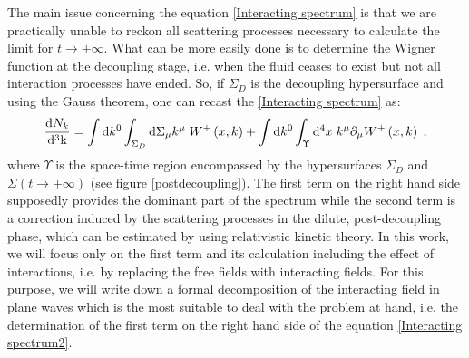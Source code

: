 \documentclass[prd,superscriptaddress,nofootinbib,notitlepage]{revtex4-1}
\newcommand{\kk}{{\rm k}}
\newcommand{\di}{{\rm d}}
\begin{document}
The main issue concerning the equation \eqref{Interacting spectrum} is that we are practically unable to reckon all 
scattering processes necessary to calculate the limit for $t \to +\infty$. What can be more easily done is to determine 
the Wigner function at the decoupling stage, i.e. when the fluid ceases to exist but not all interaction processes have ended. 
So, if $\Sigma_D$ is the decoupling hypersurface and using the Gauss theorem, one can recast the \eqref{Interacting spectrum}
as:
% 
\begin{equation}\label{Interacting spectrum2}
    \frac{\di N_k}{\di^3 \kk} = \int \di k^0 \int_{\Sigma_D} \di\Sigma_\mu k^\mu \; W^+\left(x,k\right) + 
     \int \di k^0 \int_{\Upsilon} \di^4 x \; k^\mu \partial_\mu W^+\left(x,k\right)\;,
\end{equation}
%
where $\Upsilon$ is the space-time region encompassed by the hypersurfaces $\Sigma_D$ and $\Sigma(t \to +\infty)$
(see figure \ref{postdecoupling}).
The first term on the right hand side supposedly provides the dominant part of the spectrum while the second term is
a correction induced by the scattering processes in the dilute, post-decoupling phase, which can be estimated by using 
relativistic kinetic theory. In this work, we will focus only on the first term and its calculation including the
effect of interactions, i.e. by replacing the free fields with interacting fields. For this purpose, we will write
down a formal decomposition of the interacting field in plane waves which is the most suitable to deal with the 
problem at hand, i.e. the determination of the first term on the right hand side of the equation \eqref{Interacting spectrum2}.
\end{document}
